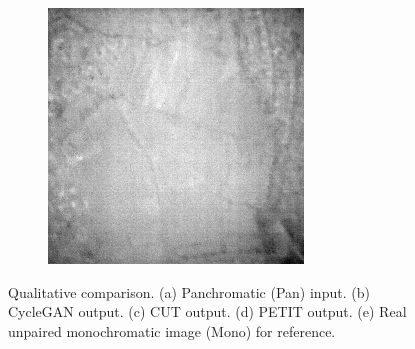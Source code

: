 \documentclass[10pt,twocolumn,letterpaper]{article}
\begin{document}
\begin{figure}[!ht]
\begin{subfigure}[b]{0.19\textwidth}
      \label{fig:petit}
  \end{subfigure}
  \hfill
  \begin{subfigure}[b]{0.19\textwidth}
      \centering
      \includegraphics[width=\textwidth]{../figs/outputs/mono/1398.png}
      \label{fig:mono}
  \end{subfigure}
  \caption{Qualitative comparison. (a) Panchromatic (Pan) input. (b) CycleGAN output. (c) CUT output. (d) PETIT output. (e) Real unpaired monochromatic image (Mono) for reference.}
  \label{fig:qual_res_sup}
\end{figure}
% 
% 
\end{document}
